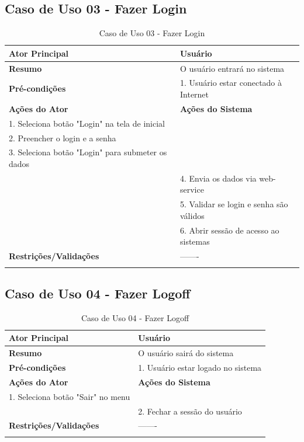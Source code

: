 \subsection{Caso de Uso 03 - Fazer Login}
\label{sc:case3}
\begin{center}
\begin{longtable}{p{8cm}|p{8cm}}
    \hline
    \textbf{Ator Principal} & Usuário \\
    \hline
    \textbf{Resumo} & O usuário entrará no sistema \\
    \hline
    \textbf{Pr\'{e}-condi\c{c}\~{o}es} & 1. Usuário estar conectado à Internet \\
    \hline
    \textbf{A\c{c}\~{o}es do Ator} & \textbf{A\c{c}\~{o}es do Sistema} \\
    
    \hline
    1. Seleciona botão "Login" na tela de inicial & \\
    \hline
    2. Preencher o login e a senha & \\
    \hline
    3. Seleciona botão "Login" para submeter os dados & \\
    \hline
    & 4. Envia os dados via web-service \\
    \hline
    & 5. Validar se login e senha são válidos \\
    \hline
    & 6. Abrir sessão de acesso ao sistemas \\
    \hline
    \hline
    \textbf{Restri\c{c}\~{o}es/Valida\c{c}\~{o}es} & -------\\
\hline
\caption{Caso de Uso 03 - Fazer Login}
\end{longtable}
\end{center}


\subsection{Caso de Uso 04 - Fazer Logoff}
\label{sc:case4}
\begin{center}
\begin{longtable}{p{8cm}|p{8cm}}
    \hline
    \textbf{Ator Principal} & Usuário \\
    \hline
    \textbf{Resumo} & O usuário sairá do sistema \\
    \hline
    \textbf{Pr\'{e}-condi\c{c}\~{o}es} & 1. Usuário estar logado no sistema \\
    \hline
    \textbf{A\c{c}\~{o}es do Ator} & \textbf{A\c{c}\~{o}es do Sistema} \\
    
    \hline
    1. Seleciona botão "Sair" no menu & \\
    \hline
    & 2. Fechar a sessão do usuário \\
    \hline
    \hline
    \textbf{Restri\c{c}\~{o}es/Valida\c{c}\~{o}es} & -------\\
\hline
\caption{Caso de Uso 04 - Fazer Logoff}
\end{longtable}
\end{center}

